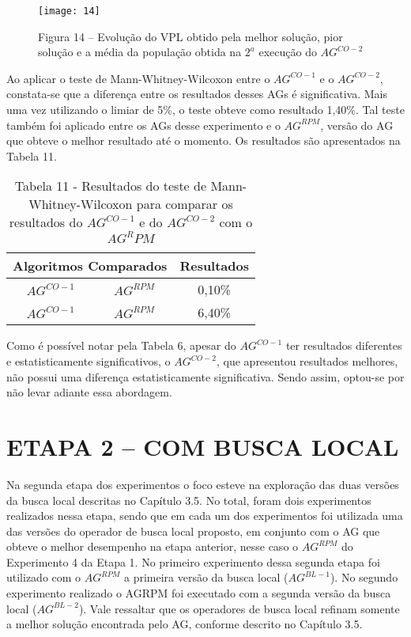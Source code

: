 \begin{figure}[H]
\centering

\texttt{[image: 14]}
\caption{Figura 14  – Evolução do VPL obtido pela melhor solução, pior solução e a média da população obtida na $2^a$ execução do $AG^{CO-2}$}

\end{figure}

Ao aplicar o teste de Mann-Whitney-Wilcoxon entre o $AG^{CO-1}$ e o $AG^{CO-2}$, constata-se que a diferença entre os resultados desses AGs é significativa. Mais uma vez utilizando o limiar de 5\%, o teste obteve como resultado 1,40\%.  Tal teste também foi aplicado entre os AGs desse experimento e o $AG^{RPM}$, versão do AG que obteve o melhor resultado até o momento. Os resultados são apresentados na Tabela 11.

\begin{table}[H]
\centering
\caption{Tabela 11 - Resultados do teste de Mann-Whitney-Wilcoxon para comparar os resultados do $AG^{CO-1}$ e do $AG^{CO-2}$ com o $AG^RPM$}

\begin{tabular}{|c|c|c|}
\hline
\multicolumn{2}{|c|}{Algoritmos Comparados} & Resultados \\ \hline
$AG^{CO-1}$ & $AG^{RPM}$ & 0,10\% \\ \hline
$AG^{CO-1}$ & $AG^{RPM}$ & 6,40\% \\ \hline

\end{tabular}
\end{table}

Como é possível notar pela Tabela 6, apesar do $AG^{CO-1}$ ter resultados diferentes e estatisticamente significativos, o $AG^{CO-2}$, que apresentou resultados melhores, não possui uma diferença estatisticamente significativa. Sendo assim, optou-se por não levar adiante essa abordagem.

\section{ETAPA 2 – COM BUSCA LOCAL}

Na segunda etapa dos experimentos o foco esteve na exploração das duas versões da busca local descritas no Capítulo 3.5. No total, foram dois experimentos realizados nessa etapa, sendo que em cada um dos experimentos foi utilizada uma das versões do operador de busca local proposto, em conjunto com o AG que obteve o melhor desempenho na etapa anterior, nesse caso o $AG^{RPM}$ do Experimento 4 da Etapa 1. No primeiro experimento dessa segunda etapa foi utilizado com o $AG^{RPM}$ a primeira versão da busca local ($AG^{BL-1}$). No segundo experimento realizado o AGRPM foi executado com a segunda versão da busca local ($AG^{BL-2}$). Vale ressaltar que os operadores de busca local refinam somente a melhor solução encontrada pelo AG, conforme descrito no Capítulo 3.5.

